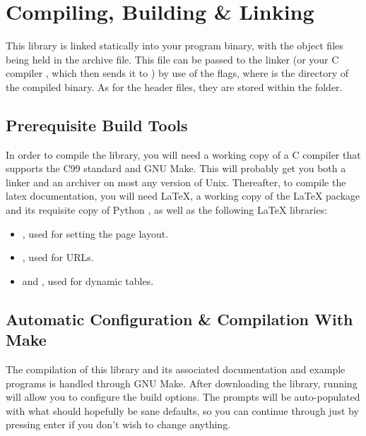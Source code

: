 \section{Compiling, Building \& Linking}

This library is linked statically into your program binary, with the  object files being held in the  archive file. This file can be passed to the linker  (or your C compiler , which then sends it to ) by use of the  flags, where  is the directory of the compiled binary. As for the header files, they are stored within the  folder.

\subsection{Prerequisite Build Tools}

In order to compile the library, you will need a working copy of a C compiler that supports the C99 standard and GNU Make. This will probably get you both a linker and an archiver on most any version of Unix. Thereafter, to compile the latex documentation, you will need \LaTeX{}, a working copy of the  \LaTeX{} package and its requisite copy of Python , as well as the following \LaTeX{} libraries:

\begin{itemize}
	\item {}, used for setting the page layout.
	\item {}, used for URLs.
	\item {} and , used for dynamic tables.
\end{itemize}

\subsection{Automatic Configuration \& Compilation With Make}

The compilation of this library and its associated documentation and example programs is handled through GNU Make. After downloading the library, running  will allow you to configure the build options. The prompts will be auto-populated with what should hopefully be sane defaults, so you can continue through just by pressing enter if you don't wish to change anything.


